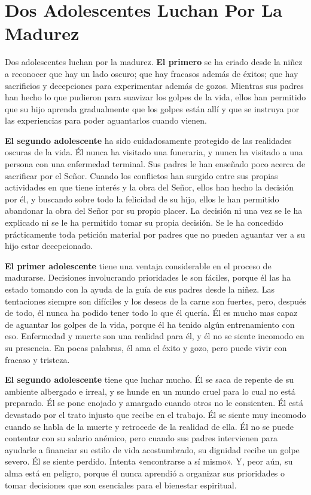 \documentclass[12pt, twoside, openright]{book}
\begin{document}
\section{Dos Adolescentes Luchan Por La Madurez}
Dos adolescentes luchan por la madurez. \textbf{El primero} se ha criado desde la niñez a reconocer que hay un lado oscuro; que hay fracasos además de éxitos; que hay sacrificios y decepciones para experimentar además de gozos. Mientras sus padres han hecho lo que pudieron para suavizar los golpes de la vida, ellos han permitido que su hijo aprenda gradualmente que los golpes están allí y que se instruya por las experiencias para poder aguantarlos cuando vienen.

\textbf{El segundo adolescente} ha sido cuidadosamente protegido de las realidades oscuras de la vida. Él nunca ha visitado una funeraria, y nunca ha visitado a una persona con una enfermedad terminal. Sus padres le han enseñado poco acerca de sacrificar por el Señor. Cuando los conflictos han surgido entre sus propias actividades en que tiene interés y la obra del Señor, ellos han hecho la decisión por él, y buscando sobre todo la felicidad de su hijo, ellos le han permitido abandonar la obra del Señor por su propio placer. La decisión ni una vez se le ha explicado ni se le ha permitido tomar su propia decisión. Se le ha concedido prácticamente toda petición material por padres que no pueden aguantar ver a su hijo estar decepcionado. 

\textbf{El primer adolescente} tiene una ventaja considerable en el proceso de madurarse. Decisiones involucrando prioridades le son fáciles, porque él las ha estado tomando con la ayuda de la guía de sus padres desde la niñez. Las tentaciones siempre son difíciles y los deseos de la carne son fuertes, pero, después de todo, él nunca ha podido tener todo lo que él quería. Él es mucho mas capaz de aguantar los golpes de la vida, porque él ha tenido algún entrenamiento con eso. Enfermedad y muerte son una realidad para él, y él no se siente incomodo en su presencia. En pocas palabras, él ama el éxito y gozo, pero puede vivir con fracaso y tristeza. 

\textbf{El segundo adolescente} tiene que luchar mucho. Él se saca de repente de su ambiente albergado e irreal, y se hunde en un mundo cruel para lo cual no está preparado. Él se pone enojado y amargado cuando otros no le consienten. Él está devastado por el trato injusto que recibe en el trabajo. Él se siente muy incomodo cuando se habla de la muerte y retrocede de la realidad de ella. Él no se puede contentar con su salario anémico, pero cuando sus padres intervienen para ayudarle a financiar su estilo de vida acostumbrado, su dignidad recibe un golpe severo. Él se siente perdido. Intenta «encontrarse a sí mismo». Y, peor aún, su alma está en peligro, porque él nunca aprendió a organizar sus prioridades o tomar decisiones que son esenciales para el bienestar espiritual.
\end{document}
